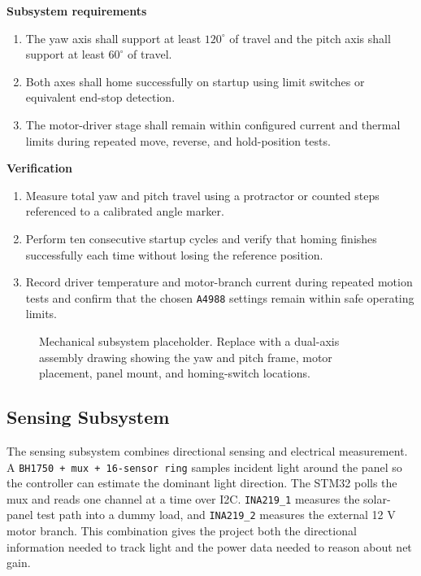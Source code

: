 \documentclass[11pt]{article}
\begin{document}
\textbf{Subsystem requirements}
\begin{enumerate}[label=\arabic*.]
\item The yaw axis shall support at least $120^\circ$ of travel and the pitch axis shall support at least $60^\circ$ of travel.
\item Both axes shall home successfully on startup using limit switches or equivalent end-stop detection.
\item The motor-driver stage shall remain within configured current and thermal limits during repeated move, reverse, and hold-position tests.
\end{enumerate}

\textbf{Verification}
\begin{enumerate}[label=\arabic*.]
\item Measure total yaw and pitch travel using a protractor or counted steps referenced to a calibrated angle marker.
\item Perform ten consecutive startup cycles and verify that homing finishes successfully each time without losing the reference position.
\item Record driver temperature and motor-branch current during repeated motion tests and confirm that the chosen \texttt{A4988} settings remain within safe operating limits.
\end{enumerate}

\begin{figure}[H]
\centering
\fbox{\rule{0pt}{2.0in}\rule{0.86\linewidth}{0pt}}
\caption{Mechanical subsystem placeholder. Replace with a dual-axis assembly drawing showing the yaw and pitch frame, motor placement, panel mount, and homing-switch locations.}
\label{fig:mechanical}
\end{figure}

\subsection{Sensing Subsystem}
The sensing subsystem combines directional sensing and electrical measurement. A \texttt{BH1750 + mux + 16-sensor ring} samples incident light around the panel so the controller can estimate the dominant light direction. The STM32 polls the mux and reads one channel at a time over I2C. \texttt{INA219\_1} measures the solar-panel test path into a dummy load, and \texttt{INA219\_2} measures the external 12 V motor branch. This combination gives the project both the directional information needed to track light and the power data needed to reason about net gain.
\end{document}
